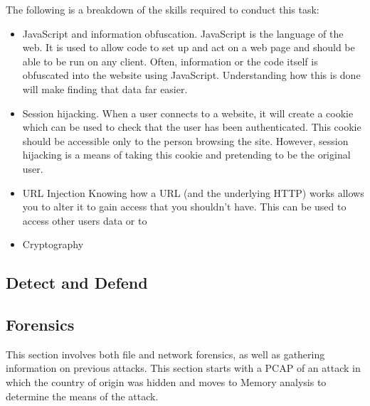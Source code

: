 \documentclass[a4paper,11pt]{report}
\begin{document}
			The following is a breakdown of the skills required to conduct this task:
			\begin{itemize}
				\item JavaScript and information obfuscation. 
					JavaScript is the language of the web. It is used to allow code to set up and act on a web page and should be able to be run on any client. 
					Often, information or the code itself is obfuscated into the website using JavaScript.
					Understanding how this is done will make finding that data far easier. 
				\item Session hijacking.
					When a user connects to a website, it will create a cookie which can be used to check that the user has been authenticated. 
					This cookie should be accessible only to the person browsing the site. 
					However, session hijacking is a means of taking this cookie and pretending to be the original user. 
				\item URL Injection
					Knowing how a URL (and the underlying HTTP) works allows you to alter it to gain access that you shouldn't have. 
					This can be used to access other users data or to 
				\item Cryptography
			\end{itemize}
		\subsection{Detect and Defend}
		\subsection{Forensics}
			This section involves both file and network forensics, as well as gathering information on previous attacks. 
			This section starts with a PCAP of an attack in which the country of origin was hidden and moves to Memory analysis to determine the means of the attack. 
			
\end{document}
